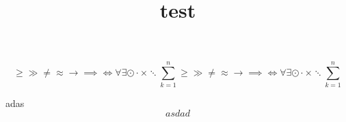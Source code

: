 \documentclass{article}
\title{test}
\begin{document}
\maketitle
\tableofcontents


\[
  \geq \gg \neq \approx \to \implies \iff \forall \exists \odot \cdot \times \ddots  \sum_{k=1}^{n}
  \geq \gg \neq \approx \to \implies \iff \forall \exists \odot \cdot \times \ddots \sum_{k=1}^{n} 
\]



adas 
\[
asdad 
\]
\end{document}
